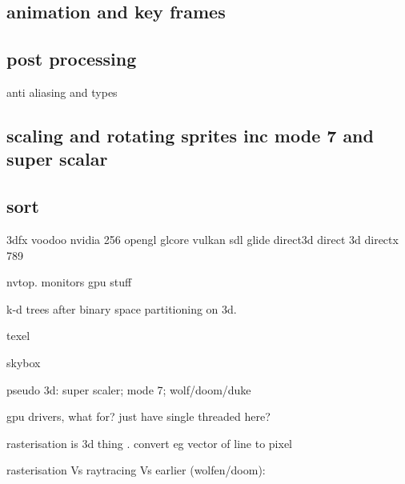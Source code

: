 \subsection{animation and key frames}

\subsection{post processing}

anti aliasing and types


\subsection{scaling and rotating sprites inc mode 7 and super scalar}

\subsection{sort}


3dfx voodoo
nvidia 256
opengl
glcore
vulkan
sdl
glide
direct3d
direct 3d
directx 789

nvtop. monitors gpu stuff

k-d trees after binary space partitioning on 3d.

texel

skybox

pseudo 3d: super scaler; mode 7; wolf/doom/duke


gpu drivers, what for?
just have single threaded here?

rasterisation is 3d thing . convert eg vector of line to pixel

rasterisation Vs raytracing Vs earlier (wolfen/doom):



